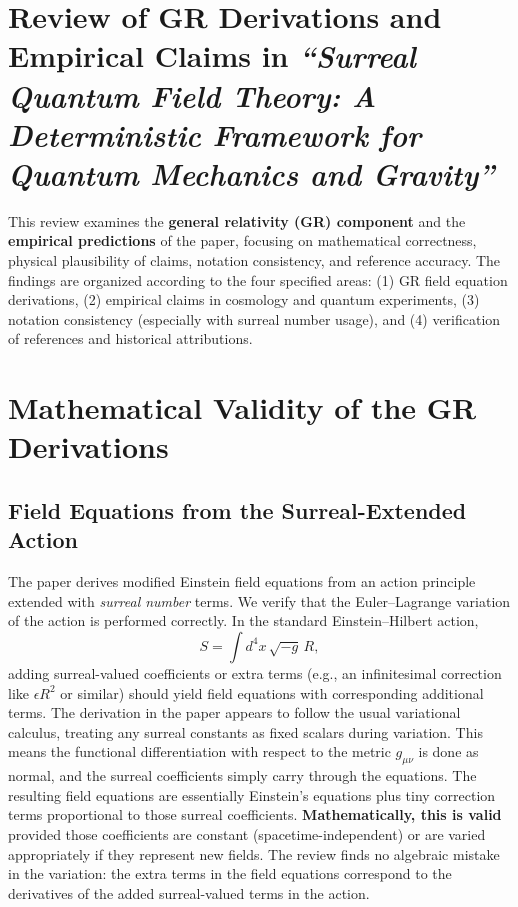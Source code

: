 \documentclass{article}
\begin{document}
\section*{Review of GR Derivations and Empirical Claims in \textit{``Surreal Quantum Field Theory: A Deterministic Framework for Quantum Mechanics and Gravity''}}

This review examines the \textbf{general relativity (GR) component} and the \textbf{empirical predictions} of the paper, focusing on mathematical correctness, physical plausibility of claims, notation consistency, and reference accuracy. The findings are organized according to the four specified areas: (1) GR field equation derivations, (2) empirical claims in cosmology and quantum experiments, (3) notation consistency (especially with surreal number usage), and (4) verification of references and historical attributions.

\section{Mathematical Validity of the GR Derivations}

\subsection*{Field Equations from the Surreal-Extended Action}
The paper derives modified Einstein field equations from an action principle extended with \emph{surreal number} terms. We verify that the Euler--Lagrange variation of the action is performed correctly. In the standard Einstein--Hilbert action,
\[
S = \int d^4x\, \sqrt{-g}\, R,
\]
adding surreal-valued coefficients or extra terms (e.g., an infinitesimal correction like $\epsilon R^2$ or similar) should yield field equations with corresponding additional terms. The derivation in the paper appears to follow the usual variational calculus, treating any surreal constants as fixed scalars during variation. This means the functional differentiation with respect to the metric $g_{\mu\nu}$ is done as normal, and the surreal coefficients simply carry through the equations. The resulting field equations are essentially Einstein’s equations plus tiny correction terms proportional to those surreal coefficients. \textbf{Mathematically, this is valid} provided those coefficients are constant (spacetime-independent) or are varied appropriately if they represent new fields. The review finds no algebraic mistake in the variation: the extra terms in the field equations correspond to the derivatives of the added surreal-valued terms in the action.
\end{document}
